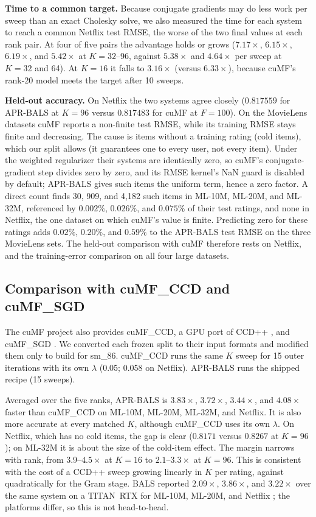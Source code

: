 \textbf{Time to a common target.} Because conjugate gradients may do less work per sweep than an exact Cholesky solve, we also measured the time for each system to reach a common Netflix test RMSE, the worse of the two final values at each rank pair. At four of five pairs the advantage holds or grows ($7.17\times$, $6.15\times$, $6.19\times$, and $5.42\times$ at $K = 32$--96, against $5.38\times$ and $4.64\times$ per sweep at $K=32$ and 64). At $K{=}16$ it falls to $3.16\times$ (versus $6.33\times$), because cuMF's rank-20 model meets the target after 10 sweeps.

\textbf{Held-out accuracy.} On Netflix the two systems agree closely ($0.817559$ for APR-BALS at $K=96$ versus $0.817483$ for cuMF at $F=100$). On the MovieLens datasets cuMF reports a non-finite test RMSE, while its training RMSE stays finite and decreasing. The cause is items without a training rating (cold items), which our split allows (it guarantees one to every user, not every item). Under the weighted regularizer their systems are identically zero, so cuMF's conjugate-gradient step divides zero by zero, and its RMSE kernel's NaN guard is disabled by default; APR-BALS gives such items the uniform term, hence a zero factor. A direct count finds 30, 909, and 4{,}182 such items in ML-10M, ML-20M, and ML-32M, referenced by $0.002\%$, $0.026\%$, and $0.075\%$ of their test ratings, and none in Netflix, the one dataset on which cuMF's value is finite. Predicting zero for these ratings adds $0.02\%$, $0.20\%$, and $0.59\%$ to the APR-BALS test RMSE on the three MovieLens sets. The held-out comparison with cuMF therefore rests on Netflix, and the training-error comparison on all four large datasets.

\subsection{Comparison with cuMF\_CCD and cuMF\_SGD}
\label{ssec:ccdsgd}

The cuMF project also provides cuMF\_CCD, a GPU port of CCD++ \cite{yu2012scalable,nisa2017parallel}, and cuMF\_SGD \cite{xie2017cumf}. We converted each frozen split to their input formats and modified them only to build for sm\_86. cuMF\_CCD runs the same $K$ sweep for 15 outer iterations with its own $\lambda$ (0.05; 0.058 on Netflix). APR-BALS runs the shipped recipe (15 sweeps).

Averaged over the five ranks, APR-BALS is $3.83\times$, $3.72\times$, $3.44\times$, and $4.08\times$ faster than cuMF\_CCD on ML-10M, ML-20M, ML-32M, and Netflix. It is also more accurate at every matched $K$, although cuMF\_CCD uses its own $\lambda$. On Netflix, which has no cold items, the gap is clear ($0.8171$ versus $0.8267$ at $K=96$); on ML-32M it is about the size of the cold-item effect. The margin narrows with rank, from $3.9$--$4.5\times$ at $K=16$ to $2.1$--$3.3\times$ at $K=96$. This is consistent with the cost of a CCD++ sweep growing linearly in $K$ per rating, against quadratically for the Gram stage. BALS reported $2.09\times$, $3.86\times$, and $3.22\times$ over the same system on a TITAN~RTX for ML-10M, ML-20M, and Netflix \cite{chen2021bals}; the platforms differ, so this is not head-to-head.

